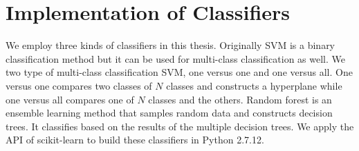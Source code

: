 \section{Implementation of Classifiers}
We employ three kinds of classifiers in this thesis.
Originally SVM is a binary classification method but it can be used for multi-class classification as well.
We two type of multi-class classification SVM, one versus one and one versus all.
One versus one compares two classes of $N$ classes and constructs a hyperplane while one versus all compares one of $N$ classes and the others.
Random forest is an ensemble learning method that samples random data and constructs decision trees.
It classifies based on the results of the multiple decision trees. 
We apply the API of scikit-learn \cite{scikit} to build these classifiers in Python 2.7.12.


